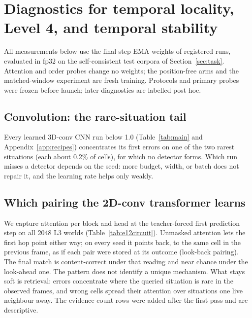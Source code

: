 \documentclass[11pt]{article}
\begin{document}
\section{Diagnostics for temporal locality, Level 4, and temporal stability}
\label{app:mech}
\label{app:e12}

All measurements below use the final-step EMA weights of registered runs, evaluated in fp32 on the self-consistent test corpora of Section~\ref{sec:task}. Attention and order probes change no weights; the position-free arms and the matched-window experiment are fresh training. Protocols and primary probes were frozen before launch; later diagnostics are labelled post hoc.

\subsection{Convolution: the rare-situation tail}

Every learned 3D-conv CNN run below 1.0 (Table~\ref{tab:main} and Appendix~\ref{app:recipes}) concentrates its first errors on one of the two rarest situations (each about 0.2\% of cells), for which no detector forms. Which run misses a detector depends on the seed: more budget, width, or batch does not repair it, and the learning rate helps only weakly.

\subsection{Which pairing the 2D-conv transformer learns}

We capture attention per block and head at the teacher-forced first prediction step on all 2048 L3 worlds (Table~\ref{tab:e12circuit}). Unmasked attention lets the first hop point either way; on every seed it points back, to the same cell in the previous frame, as if each pair were stored at its outcome (look-back pairing). The final match is content-correct under that reading and near chance under the look-ahead one. The pattern does not identify a unique mechanism. What stays soft is retrieval: errors concentrate where the queried situation is rare in the observed frames, and wrong cells spread their attention over situations one live neighbour away. The evidence-count rows were added after the first pass and are descriptive.
\end{document}
